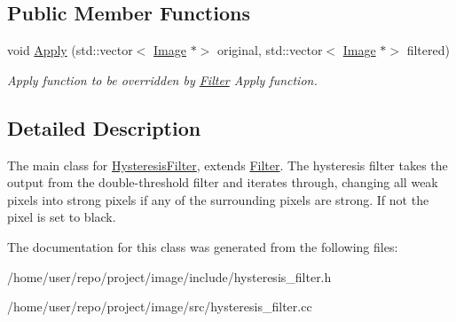\subsection*{Public Member Functions}
\begin{DoxyCompactItemize}
\item 
\mbox{\label{classHysteresisFilter_af2d6c50bc0cfd609fbf7e90f01b03b1f}} 
void \hyperlink{classHysteresisFilter_af2d6c50bc0cfd609fbf7e90f01b03b1f}{Apply} (std\+::vector$<$ \hyperlink{classImage}{Image} $\ast$$>$ original, std\+::vector$<$ \hyperlink{classImage}{Image} $\ast$$>$ filtered)
\begin{DoxyCompactList}\small\item\em Apply function to be overridden by \hyperlink{classFilter}{Filter} Apply function. \end{DoxyCompactList}\end{DoxyCompactItemize}


\subsection{Detailed Description}
The main class for \hyperlink{classHysteresisFilter}{Hysteresis\+Filter}, extends \hyperlink{classFilter}{Filter}. The hysteresis filter takes the output from the double-\/threshold filter and iterates through, changing all \textquotesingle{}weak\textquotesingle{} pixels into \textquotesingle{}strong\textquotesingle{} pixels if any of the surrounding pixels are \textquotesingle{}strong.\textquotesingle{} If not the pixel is set to black. 

The documentation for this class was generated from the following files\+:\begin{DoxyCompactItemize}
\item 
/home/user/repo/project/image/include/hysteresis\+\_\+filter.\+h\item 
/home/user/repo/project/image/src/hysteresis\+\_\+filter.\+cc\end{DoxyCompactItemize}
